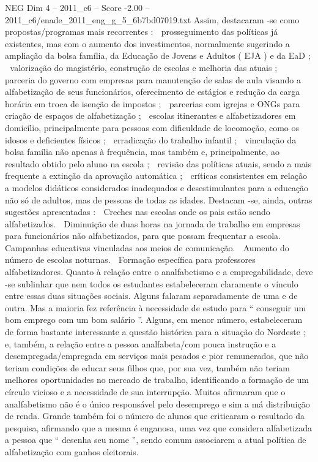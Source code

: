\begin{textsample}{NEG Dim 4 – 2011\_c6 – Score -2.00 – 2011\_c6/enade\_2011\_eng\_g\_5\_6b7bd07019.txt}
Assim, destacaram -se como propostas/programas mais recorrentes :  prosseguimento das políticas já existentes, mas com o aumento dos investimentos, normalmente sugerindo a ampliação da bolsa família, da Educação de Jovens e Adultos ( EJA ) e da EaD ;  valorização do magistério, construção de escolas e melhoria das atuais ;  parceria do governo com empresas para manutenção de salas de aula visando a alfabetização de seus funcionários, oferecimento de estágios e redução da carga horária em troca de isenção de impostos ;  parcerias com igrejas e ONGs para criação de espaços de alfabetização ;  escolas itinerantes e alfabetizadores em domicílio, principalmente para pessoas com dificuldade de locomoção, como os idosos e deficientes físicos ;  erradicação do trabalho infantil ;  vinculação da bolsa família não apenas à frequência, mas também e, principalmente, ao resultado obtido pelo aluno na escola ;  revisão das políticas atuais, sendo a mais frequente a extinção da aprovação automática ;  críticas consistentes em relação a modelos didáticos considerados inadequados e desestimulantes para a educação não só de adultos, mas de pessoas de todas as idades.
Destacam -se, ainda, outras sugestões apresentadas :  Creches nas escolas onde os pais estão sendo alfabetizados.  Diminuição de duas horas na jornada de trabalho em empresas para funcionários não alfabetizados, para que possam frequentar a escola.  Campanhas educativas vinculadas aos meios de comunicação.  Aumento do número de escolas noturnas.  Formação específica para professores alfabetizadores.
Quanto à relação entre o analfabetismo e a empregabilidade, deve -se sublinhar que nem todos os estudantes estabeleceram claramente o vínculo entre essas duas situações sociais.
Alguns falaram separadamente de uma e de outra.
Mas a maioria fez referência à necessidade de estudo para “ conseguir um bom emprego com um bom salário ”.
Alguns, em menor número, estabeleceram de forma bastante interessante a questão histórica para a situação do Nordeste ; e, também, a relação entre a pessoa analfabeta/com pouca instrução e a desempregada/empregada em serviços mais pesados e pior remunerados, que não teriam condições de educar seus filhos que, por sua vez, também não teriam melhores oportunidades no mercado de trabalho, identificando a formação de um círculo vicioso e a necessidade de sua interrupção.
Muitos afirmaram que o analfabetismo não é o único responsável pelo desemprego e sim a má distribuição de renda.
Grande também foi o número de alunos que criticaram o resultado da pesquisa, afirmando que a mesma é enganosa, uma vez que considera alfabetizada a pessoa que “ desenha seu nome ”, sendo comum associarem a atual política de alfabetização com ganhos eleitorais.

\end{textsample}
